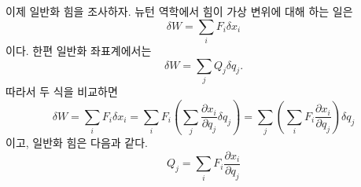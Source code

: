 \documentclass[chapter, oneside, b5paper]{oblivoir}
\theoremstyle{plain}
\theoremstyle{definition}
\theoremstyle{remark}
\begin{document}
이제 일반화 힘을 조사하자. 뉴턴 역학에서 힘이 가상 변위에 대해 하는 일은
\begin{equation}
    \delta W = \sum_i F_i \delta x_i \label{eq:6.52}
\end{equation}
이다. 한편 일반화 좌표계에서는
\begin{equation}
    \delta W = \sum_j Q_j \delta q_j. \label{eq:6.53}
\end{equation}
따라서 두 식을 비교하면
\begin{equation}
    \delta W = \sum_i F_i \delta x_i = \sum_i F_i \left(\sum_j \frac{\partial x_i}{\partial q_j} \delta q_j \right) = \sum_j \left(\sum_i F_i \frac{\partial x_i}{\partial q_j}\right) \delta q_j
\end{equation}
이고, 일반화 힘은 다음과 같다.
\begin{equation}
    Q_j = \sum_i F_i \frac{\partial x_i}{\partial q_j} \label{eq:6.55}
\end{equation}
\end{document}
